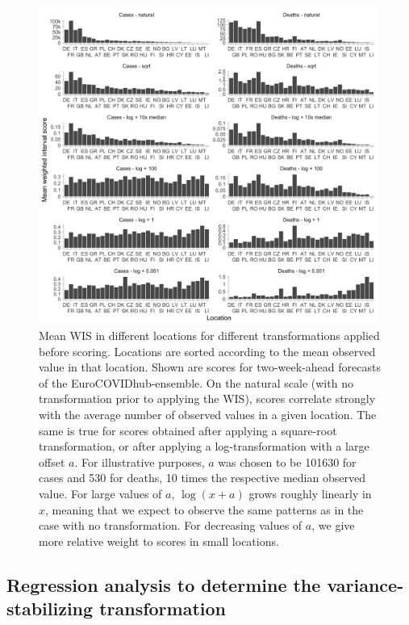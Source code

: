 \documentclass[10pt,letterpaper]{article}
\begin{document}
\begin{figure}[h!]
    \centering
    \includegraphics[width=0.99\textwidth]{../output/figures/HUB-scores-locations-log-variants.png}
    \caption{Mean WIS in different locations for different transformations applied before scoring. Locations are sorted according to the mean observed value in that location. Shown are scores for two-week-ahead forecasts of the EuroCOVIDhub-ensemble. On the natural scale (with no transformation prior to applying the WIS), scores correlate strongly with the average number of observed values in a given location. The same is true for scores obtained after applying a square-root transformation, or after applying a log-transformation with a large offset $a$. For illustrative purposes, $a$ was chosen to be 101630 for cases and 530 for deaths, 10 times the respective median observed value. For large values of $a$, $\log(x + a)$ grows roughly linearly in $x$, meaning that we expect to observe the same patterns as in the case with no transformation. For decreasing values of $a$, we give more relative weight to scores in small locations.}
    \label{fig:HUB-log-different-offsets}
\end{figure}


\subsection*{Regression analysis to determine the variance-stabilizing transformation}
\label{sec:HUB-regression}
\end{document}
